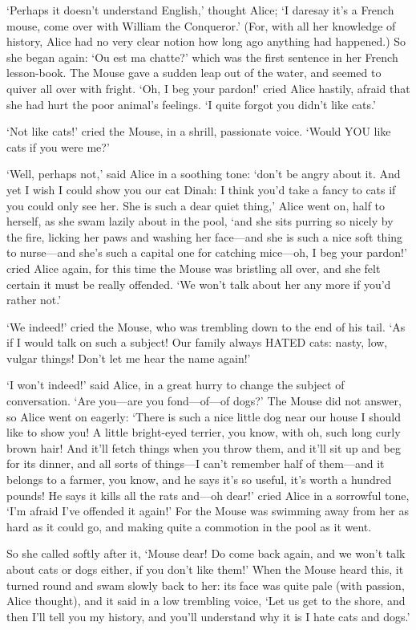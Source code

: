\documentclass[12pt]{article}
\begin{document}
\begin{Parallel}[p]{}{}
{‘Perhaps it doesn’t understand English,’ thought Alice; ‘I daresay it’s a French mouse, come over with William the Conqueror.’ (For, with all her knowledge of history, Alice had no very clear notion how long ago anything had happened.) So she began again: ‘Ou est ma chatte?’ which was the first sentence in her French lesson-book. The Mouse gave a sudden leap out of the water, and seemed to quiver all over with fright. ‘Oh, I beg your pardon!’ cried Alice hastily, afraid that she had hurt the poor animal’s feelings. ‘I quite forgot you didn’t like cats.’

‘Not like cats!’ cried the Mouse, in a shrill, passionate voice. ‘Would YOU like cats if you were me?’

‘Well, perhaps not,’ said Alice in a soothing tone: ‘don’t be angry about it. And yet I wish I could show you our cat Dinah: I think you’d take a fancy to cats if you could only see her. She is such a dear quiet thing,’ Alice went on, half to herself, as she swam lazily about in the pool, ‘and she sits purring so nicely by the fire, licking her paws and washing her face—and she is such a nice soft thing to nurse—and she’s such a capital one for catching mice—oh, I beg your pardon!’ cried Alice again, for this time the Mouse was bristling all over, and she felt certain it must be really offended. ‘We won’t talk about her any more if you’d rather not.’

‘We indeed!’ cried the Mouse, who was trembling down to the end of his tail. ‘As if I would talk on such a subject! Our family always HATED cats: nasty, low, vulgar things! Don’t let me hear the name again!’

‘I won’t indeed!’ said Alice, in a great hurry to change the subject of conversation. ‘Are you—are you fond—of—of dogs?’ The Mouse did not answer, so Alice went on eagerly: ‘There is such a nice little dog near our house I should like to show you! A little bright-eyed terrier, you know, with oh, such long curly brown hair! And it’ll fetch things when you throw them, and it’ll sit up and beg for its dinner, and all sorts of things—I can’t remember half of them—and it belongs to a farmer, you know, and he says it’s so useful, it’s worth a hundred pounds! He says it kills all the rats and—oh dear!’ cried Alice in a sorrowful tone, ‘I’m afraid I’ve offended it again!’ For the Mouse was swimming away from her as hard as it could go, and making quite a commotion in the pool as it went.

So she called softly after it, ‘Mouse dear! Do come back again, and we won’t talk about cats or dogs either, if you don’t like them!’ When the Mouse heard this, it turned round and swam slowly back to her: its face was quite pale (with passion, Alice thought), and it said in a low trembling voice, ‘Let us get to the shore, and then I’ll tell you my history, and you’ll understand why it is I hate cats and dogs.’

}
\end{Parallel}
\end{document}
